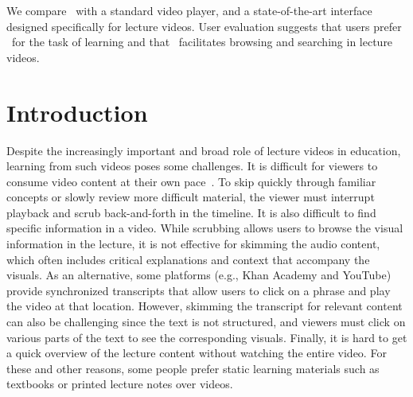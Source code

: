 We compare \systemname\ with a standard video player, and a state-of-the-art interface designed specifically for 
lecture videos. User evaluation suggests that users prefer \systemname\ for the task of learning and that \systemname\
facilitates browsing and searching in lecture videos.


\section{Introduction}
Despite the increasingly important and broad role of lecture videos in education, learning from such videos poses some challenges. 
%
It is difficult for viewers to consume video content at their own pace~\cite{chi2012mixt}.
%
To skip quickly through familiar concepts or slowly review more difficult material, the viewer must interrupt playback and scrub back-and-forth in the timeline.
%
It is also difficult to find specific information in a video. While scrubbing allows users to browse the visual information in the lecture, it is not effective for skimming the audio content, which often includes critical explanations and context that accompany the visuals. As an alternative, some platforms (e.g., Khan Academy and YouTube) provide synchronized transcripts that allow users to click on a phrase and play the video at that location. However, skimming the transcript for relevant content can also be challenging since the text is not structured, and viewers must click on various parts of the text to see the corresponding visuals. 
%
Finally, it is hard to get a quick overview of the lecture content without watching the entire video. 
For these and other reasons, some people prefer static learning materials such as textbooks or printed lecture notes over videos.\\


